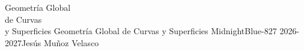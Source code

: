 \documentclass[12pt]{book}
\begin{document}

    
    
            {Geometría Global\\de Curvas\\y Superficies}
            {Geometría Global de Curvas y Superficies}
            {MidnightBlue}{-8}{27}
            {2026-2027}{Jesús Muñoz Velasco}
    
    
    
    
\end{document}
